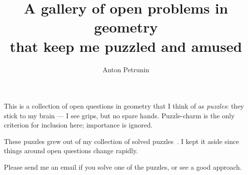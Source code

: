 \documentclass[twoside]{article}
\begin{document}
\title{
A gallery of open problems in geometry\\
that keep me puzzled and amused
}
\author{Anton Petrunin}
\date{}
\maketitle

This is a collection of open questions in geometry that I think of as \textit{puzzles}:
they stick to my brain --- I see grips, but no spare hands.
Puzzle-charm is the only criterion for inclusion here;
importance is ignored.

These puzzles grew out of my collection of solved puzzles~\cite{petrunin2021pigtikal}.
I kept it aside since things around open questions change rapidly.

Please send me an email if you solve one of the puzzles, or see a good approach.

\renewcommand\thesubsection{\arabic{subsection}}




\sloppy
\printbibliography[heading=bibintoc]
\fussy
\end{document}
